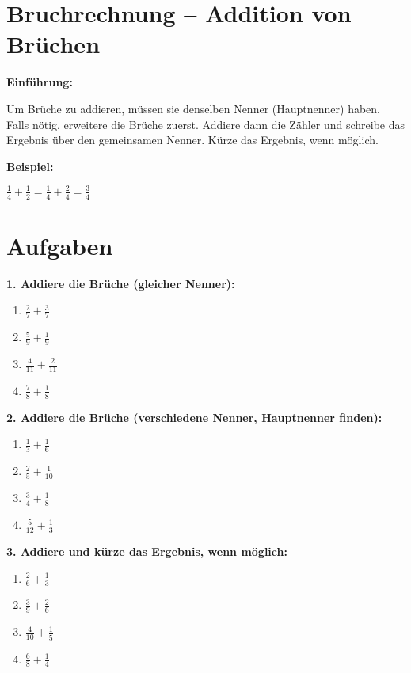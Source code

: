 \section*{Bruchrechnung – Addition von Brüchen}

\textbf{Einführung:}

Um Brüche zu addieren, müssen sie denselben Nenner (Hauptnenner) haben. Falls nötig, erweitere die Brüche zuerst. Addiere dann die Zähler und schreibe das Ergebnis über den gemeinsamen Nenner. Kürze das Ergebnis, wenn möglich.

\textbf{Beispiel:}

$\frac{1}{4} + \frac{1}{2} = \frac{1}{4} + \frac{2}{4} = \frac{3}{4}$

\section*{Aufgaben}

\textbf{1. Addiere die Brüche (gleicher Nenner):}
\begin{multicols}{2}
\begin{enumerate}[label=\alph*)]
  \item $\displaystyle \frac{2}{7} + \frac{3}{7}$
  \item $\displaystyle \frac{5}{9} + \frac{1}{9}$
  \item $\displaystyle \frac{4}{11} + \frac{2}{11}$
  \item $\displaystyle \frac{7}{8} + \frac{1}{8}$
\end{enumerate}
\end{multicols}

\textbf{2. Addiere die Brüche (verschiedene Nenner, Hauptnenner finden):}
\begin{multicols}{2}
\begin{enumerate}[label=\alph*)]
  \item $\displaystyle \frac{1}{3} + \frac{1}{6}$
  \item $\displaystyle \frac{2}{5} + \frac{1}{10}$
  \item $\displaystyle \frac{3}{4} + \frac{1}{8}$
  \item $\displaystyle \frac{5}{12} + \frac{1}{3}$
\end{enumerate}
\end{multicols}

\textbf{3. Addiere und kürze das Ergebnis, wenn möglich:}
\begin{multicols}{2}
\begin{enumerate}[label=\alph*)]
  \item $\displaystyle \frac{2}{6} + \frac{1}{3}$
  \item $\displaystyle \frac{3}{9} + \frac{2}{6}$
  \item $\displaystyle \frac{4}{10} + \frac{1}{5}$
  \item $\displaystyle \frac{6}{8} + \frac{1}{4}$
\end{enumerate}
\end{multicols}

